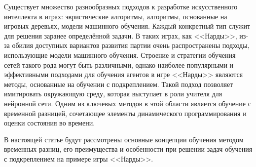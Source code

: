 Существует множество разнообразных подходов к разработке искусственного интеллекта в играх: эвристические алгоритмы, алгоритмы, основанные на игровых деревьях, модели машинного обучения. Каждый конкретный тип служит для решения заранее определённой задачи. В таких играх, как <<Нарды>>, из-за обилия доступных вариантов развития партии очень распространены подходы, использующие модели машинного обучения. Строение и стратегии обучения сетей такого рода могут быть различными, однако наиболее популярными и эффективными подходами для обучения агентов в игре <<Нарды>> являются методы, основанные на обучении с подкреплением. Такой подход позволяет имитировать окружающую среду, которая выступает в роли учителя для нейронной сети. Одним из ключевых методов в этой области является обучение с временной разницей, сочетающее элементы динамического программирования и оценки состояния во времени.

В настоящей статье будут рассмотрены основные концепции обучения методом временных разниц, его преимущества и особенности при решении задач обучения с подкреплением на примере игры <<Нарды>>.
